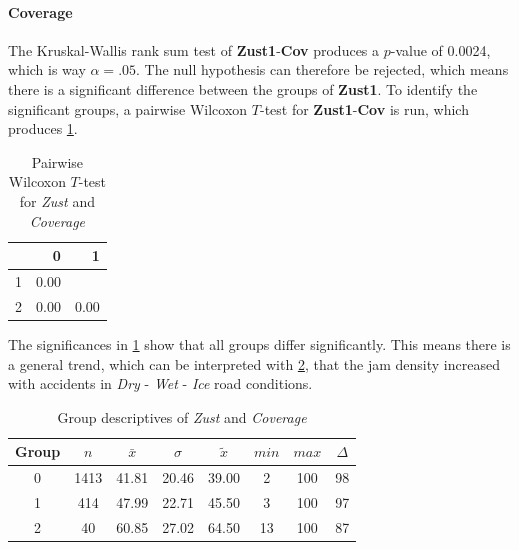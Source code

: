 \paragraph{Coverage}
The Kruskal-Wallis rank sum test of \textbf{Zust1}-\textbf{Cov} produces a $p$-value of 0.0024, which is way $\alpha=.05$. The null hypothesis can therefore be rejected, which means there is a significant difference between the groups of \textbf{Zust1}. To identify the significant groups, a pairwise Wilcoxon $T$-test for \textbf{Zust1}-\textbf{Cov} is run, which produces \cref{tbl:wilcoxon_baysis_matched_Zust_Cov}. 
\begin{table}[ht!]
	\tiny
	\centering
    \begin{tabular}{rrr}
        \toprule
        & 0 & 1 \\ 
        \midrule
        1 & 0.00 &  \\ 
        2 & 0.00 & 0.00 \\ 
        \bottomrule
      \end{tabular}
	\caption{Pairwise Wilcoxon $T$-test for \textit{Zust} and \textit{Coverage}}
	\label{tbl:wilcoxon_baysis_matched_Zust_Cov}
\end{table}
The significances in \cref{tbl:wilcoxon_baysis_matched_Zust_Cov} show that all groups differ significantly. This means there is a general trend, which can be interpreted with \cref{tbl:descriptives_baysis_matched_Zust_Cov}, that the jam density increased with accidents in \textit{Dry} - \textit{Wet} - \textit{Ice} road conditions.
\begin{table}[ht!]
	\tiny
	\centering
    \begin{tabular}{c|c|c|c|c|c|c|c}
        \toprule
        Group & $n$ & $\bar{x}$ & $\sigma$ & $\tilde{x}$ & $min$ & $max$ & $\Delta$ \\ 
        \midrule
        0 & 1413 & 41.81 & 20.46 & 39.00 & 2  & 100 & 98 \\ 
        1 & 414  & 47.99 & 22.71 & 45.50 & 3  & 100 & 97 \\ 
        2 & 40   & 60.85 & 27.02 & 64.50 & 13 & 100 & 87 \\ 
        \bottomrule
      \end{tabular}
	\caption{Group descriptives of \textit{Zust} and \textit{Coverage}}
	\label{tbl:descriptives_baysis_matched_Zust_Cov}
\end{table}

